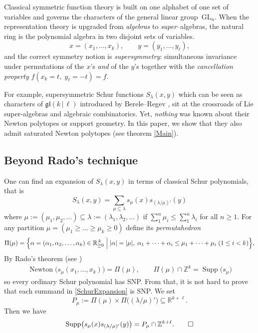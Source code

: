 \documentclass[12pt,a4paper,oneside]{amsart}
\theoremstyle{definition}
\DeclareMathOperator{\Supp}{Supp}
\DeclareMathOperator{\Newton}{Newton}
\newcommand{\Z}{\mathbb{Z}}
\newcommand{\R}{\mathbb{R}}
\begin{document}
Classical symmetric function theory is built on one alphabet of one set of variables and governs the characters of the general linear group~$\mathrm{GL}_{n}$. When the representation theory is upgraded from \emph{algebras} to \emph{super}–algebras, the natural ring is the polynomial algebra in
two disjoint sets of variables.
\[
   x=(x_{1},\dots ,x_{k}),\qquad
   y=(y_{1},\dots ,y_{\ell}),
\]
and the correct symmetry notion is \emph{supersym\-metry}: simultaneous invariance under permutations of the $x$’s \emph{and} of the $y$’s together with the \emph{cancellation property} $f(x_{k}=t,\;y_{\ell}=-t)=f$.

For example, supersymmetric Schur functions $S_{\lambda}(x,y)$ which can be seen as characters of $\mathfrak{gl}(k\,|\,\ell)$ introduced by Berele–Regev \cite{BR87}, sit at the crossroads of Lie super-algebras and algebraic combinatorics. Yet, \emph{nothing} was known about their Newton polytopes or support geometry. In this paper, we show that they also admit saturated Newton polytopes (see theorem \ref{Main}).  

\subsection{Beyond Rado's technique}
One can find an expansion of $S_\lambda(x,y)$ in terms of classical Schur polynomials, that is
\begin{equation}\label{SchurExpansion}
    S_{\lambda}(x,y) = \sum_{\mu \subseteq \lambda} s_{\mu}(x)s_{(\lambda/\mu)'}(y)
\end{equation}
where $\mu:= (\mu_1,\mu_2,\ldots) \subseteq \lambda:= (\lambda_1,\lambda_2,\ldots)$ if $\sum_1^n \mu_i \leq \sum_1^n \lambda_i$ for all $n \geq 1$. For any partition $\mu=(\mu_1\ge\dots\ge\mu_k\ge0)$ define its
\emph{permutahedron}
\[
   \Pi(\mu)=\Bigl\{\alpha= (\alpha_1,\alpha_2,\ldots,\alpha_k)\in\R_{\ge0}^{\,k}\;\Big|\;
      |\alpha|=|\mu|,
      \;\alpha_1+\dots+\alpha_i\le\mu_1+\dots+\mu_i\;(1\le i<k)\Bigr\},
\]
By Rado's theorem (see \cite{MTY19})
\begin{align}\label{eq:snp_schur}
    \Newton\bigl(s_\mu(x_1,\dots,x_k)\bigr)=\Pi(\mu),
   \qquad
   \Pi(\mu)\cap\Z^{k}=\Supp\bigl(s_\mu\bigr)
\end{align}
so every ordinary Schur polynomial has SNP. From that, it is not hard to prove that each summand in \ref{SchurExpansion} is SNP. We set
\begin{equation} \label{eq:p_mu}
   P_\mu := \Pi(\mu) \times \Pi\bigl((\lambda/\mu)'\bigr) \subseteq\R^{k+\ell}.
\end{equation}
Then we have
\begin{equation} \label{eq:supp_prod}
   \Supp\bigl(s_\mu(x)s_{(\lambda/\mu)'}(y)\bigr) = P_\mu\cap\Z^{k+\ell}. \qedhere
\end{equation}
\end{document}

